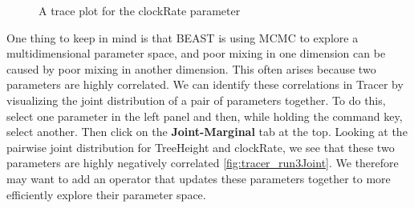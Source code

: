 \documentclass[11pt]{article}
\begin{document}
\begin{figure}[!h]
\centering
{}
\caption{\small A trace plot for the clockRate parameter}
\label{fig:tracer_run3}
\end{figure} 

One thing to keep in mind is that BEAST is using MCMC to explore a multidimensional parameter space, and poor mixing in one dimension can be caused by poor mixing in another dimension. This often arises because two parameters are highly correlated. We can identify these correlations in Tracer by visualizing the joint distribution of a pair of parameters together. To do this, select one parameter in the left panel and then, while holding the command key, select another. Then click on the \textbf{Joint-Marginal} tab at the top. Looking at the pairwise joint distribution for TreeHeight and clockRate, we see that these two parameters are highly negatively correlated \ref{fig:tracer_run3Joint}. We therefore may want to add an operator that updates these parameters together to more efficiently explore their parameter space.
\end{document}
